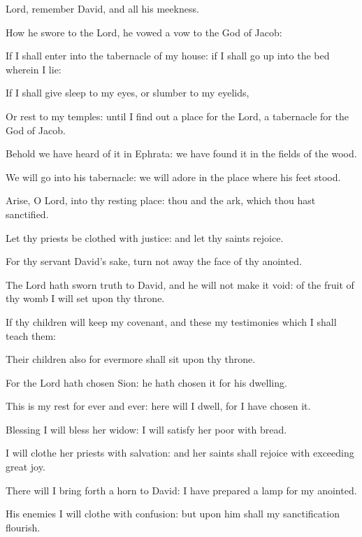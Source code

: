 ﻿\item Lord, remember David, and all his meekness.
\item How he swore to the Lord, he vowed a vow to the God of Jacob:
\item If I shall enter into the tabernacle of my house: if I shall go up into the bed wherein I lie:
\item If I shall give sleep to my eyes, or slumber to my eyelids,
\item Or rest to my temples: until I find out a place for the Lord, a tabernacle for the God of Jacob.
\item Behold we have heard of it in Ephrata: we have found it in the fields of the wood.
\item We will go into his tabernacle: we will adore in the place where his feet stood.
\item Arise, O Lord, into thy resting place: thou and the ark, which thou hast sanctified.
\item Let thy priests be clothed with justice: and let thy saints rejoice. 
\item For thy servant David's sake, turn not away the face of thy anointed.
\item The Lord hath sworn truth to David, and he will not make it void: of the fruit of thy womb I will set upon thy throne.
\item If thy children will keep my covenant, and these my testimonies which I shall teach them:
\item Their children also for evermore shall sit upon thy throne. 
\item For the Lord hath chosen Sion: he hath chosen it for his dwelling.
\item This is my rest for ever and ever: here will I dwell, for I have chosen it.
\item Blessing I will bless her widow: I will satisfy her poor with bread.
\item I will clothe her priests with salvation: and her saints shall rejoice with exceeding great joy.
\item There will I bring forth a horn to David: I have prepared a lamp for my anointed.
\item His enemies I will clothe with confusion: but upon him shall my sanctification flourish.